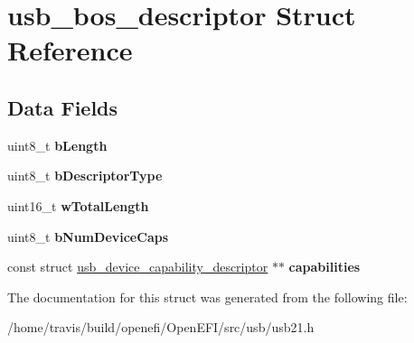 \hypertarget{structusb__bos__descriptor}{}\section{usb\+\_\+bos\+\_\+descriptor Struct Reference}
\label{structusb__bos__descriptor}
\subsection*{Data Fields}
\begin{DoxyCompactItemize}
\item 
\mbox{\label{structusb__bos__descriptor_aa3a661440a4b6d6a2ecf27da740c4121}} 
uint8\+\_\+t {\bfseries b\+Length}
\item 
\mbox{\label{structusb__bos__descriptor_afd74417a44821690051d50cd5ffdd581}} 
uint8\+\_\+t {\bfseries b\+Descriptor\+Type}
\item 
\mbox{\label{structusb__bos__descriptor_ab45b26a3249589469a53b2cfb99ddd1d}} 
uint16\+\_\+t {\bfseries w\+Total\+Length}
\item 
\mbox{\label{structusb__bos__descriptor_a2c0e68a49d6904d32413f3b3598bb926}} 
uint8\+\_\+t {\bfseries b\+Num\+Device\+Caps}
\item 
\mbox{\label{structusb__bos__descriptor_acaf102bddb6e6f6ef6d0d4d233061257}} 
const struct \hyperlink{structusb__device__capability__descriptor}{usb\+\_\+device\+\_\+capability\+\_\+descriptor} $\ast$$\ast$ {\bfseries capabilities}
\end{DoxyCompactItemize}


The documentation for this struct was generated from the following file\+:\begin{DoxyCompactItemize}
\item 
/home/travis/build/openefi/\+Open\+E\+F\+I/src/usb/usb21.\+h\end{DoxyCompactItemize}
